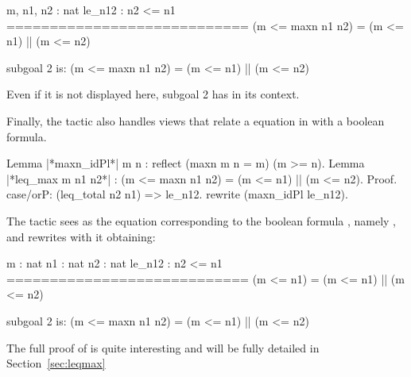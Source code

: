 \begin{coqout}{}{}
m, n1, n2 : nat
le_n12 : n2 <= n1
============================
(m <= maxn n1 n2) = (m <= n1) || (m <= n2)

subgoal 2 is:
 (m <= maxn n1 n2) = (m <= n1) || (m <= n2)
\end{coqout}
Even if it is not displayed here, subgoal 2 has 
in its context.

Finally, the  tactic also handles views that relate a 
equation in  with a boolean formula.

\begin{coq}{}{}
Lemma |*maxn_idPl*| {m n} : reflect (maxn m n = m) (m >= n).
Lemma |*leq_max m n1 n2*| :
  (m <= maxn n1 n2) = (m <= n1) || (m <= n2).
Proof.
case/orP: (leq_total n2 n1) => le_n12.
  rewrite (maxn_idPl le_n12).
\end{coq}
The tactic sees  as the equation corresponding
to the boolean formula , namely ,
and rewrites with it obtaining:

\begin{coqout}{}{}

  m : nat
  n1 : nat
  n2 : nat
  le_n12 : n2 <= n1
  ============================
   (m <= n1) = (m <= n1) || (m <= n2)

subgoal 2 is:
 (m <= maxn n1 n2) = (m <= n1) || (m <= n2)
\end{coqout}

The full proof of  is quite interesting and will be fully
detailed in Section~\ref{sec:leqmax}





